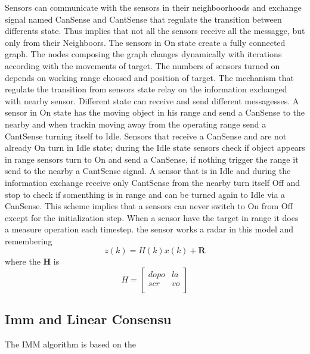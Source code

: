 \documentclass{article}
\begin{document}
\begin{multicols}{2}
\begin{figure}[h!]
                \label{fig:galaxy}
                \end{figure}
            Sensors can communicate with the sensors in their neighboorhoods and exchange signal named CanSense and CantSense that regulate the transition
            between differents state. Thus implies that not all the sensors receive all the messagge, but only from their Neighboors. The sensors in On state
            create a fully connected graph. The nodes composing the graph changes dynamically with iterations according with the movements of target. The numbers of
            sensors turned on depends on working range choosed and position of target. The mechanism that regulate the transition from sensors state 
            relay on the information exchanged with nearby sensor. Different state can receive and send different messagesses. A sensor in On state has the moving 
            object in his range and send a CanSense to the nearby and when trackin moving away from the operating range send a CantSense turning itself to Idle. 
            Sensors that receive a CanSense and are not already On turn in Idle state; during the Idle state sensors check
            if object appears in range sensors turn to On and send a CanSense, if nothing trigger the range it send to the nearby a CantSense signal.
            A sensor that is in Idle and during the information exchange receive only CantSense from the nearby turn itself Off and stop to check if somenthing is in range and
            can be turned again to Idle via a CanSense. This scheme implies that a sensors can never switch to On from Off except for the initialization step. 
            When a sensor have the target in range it does a measure operation each timestep. the sensor works a radar in this model and remembering
            \begin{equation}
                z(k)=H(k)x(k)+\textbf{R}
            \end{equation}
            where the \textbf{H} is 
            \begin{equation}
                H= \begin{bmatrix}
                    dopo & la \\
                    scr & vo \\
                \end{bmatrix}
            \end{equation} 
        \subsection*{Imm and Linear Consensu}
               The IMM algorithm is based on the 
                

\end{multicols}
\end{document}
